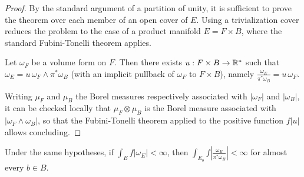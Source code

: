 \documentclass[english]{article}
\begin{document}
\begin{proof}
    By the standard argument of a partition of unity, it is sufficient to prove the theorem over each member of an open cover of $E$. 
    Using a trivialization cover reduces the problem to the case of a product manifold $E = F\times B$, where the standard Fubini-Tonelli theorem applies. 
    
    Let $\omega_F$ be a volume form on $F$. Then there exists $u : F \times B \to \mathbb{R}^*$ such that $\omega_E= u \,\omega_F \wedge \pi^*\omega_B $ (with an implicit pullback of $\omega_F$ to $F\times B$), namely $\frac{\omega_E}{\pi^*\omega_B} = u \,\omega_F$.
    
    Writing $\mu_F$ and $\mu_B$ the Borel measures respectively associated with $|\omega_F|$ and $|\omega_B|$, it can be checked locally that $\mu_F\otimes \mu_B$ is the Borel measure associated with $|\omega_F\wedge \omega_B|$, so that the Fubini-Tonelli theorem applied to the positive function $f|u|$ allows concluding.
\end{proof}

\begin{corollary}\label{corno:Fubini}
    Under the same hypotheses, if $\int_{E} f |\omega_E| < \infty$, 
    then $\int_{E_b} f \left| \frac{\omega_E}{\pi^*\omega_B} \right| < \infty$ for almost every $b\in B$.
\end{corollary}
\end{document}
